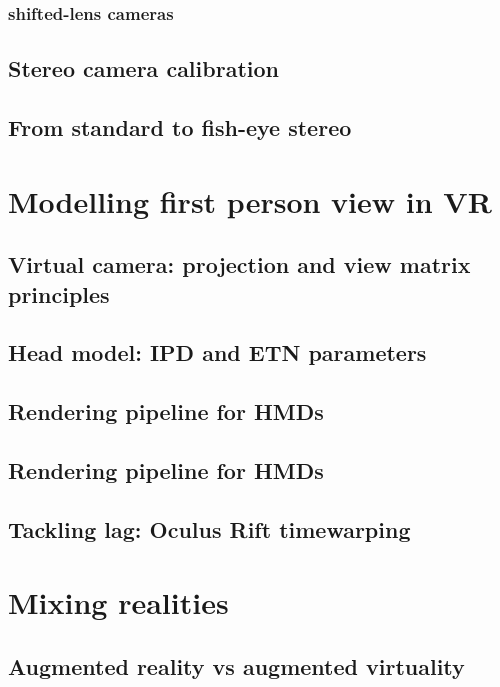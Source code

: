 \subsubsection{shifted-lens cameras}

\subsection{Stereo camera calibration}

\subsection{From standard to fish-eye stereo}


\section{Modelling first person view in VR}

\subsection{Virtual camera: projection and view matrix principles}

\subsection{Head model: IPD and ETN parameters}

\subsection{Rendering pipeline for HMDs}

\subsection{Rendering pipeline for HMDs}

\subsection{Tackling lag: Oculus Rift timewarping}


\section{Mixing realities}

\subsection{Augmented reality vs augmented virtuality}










